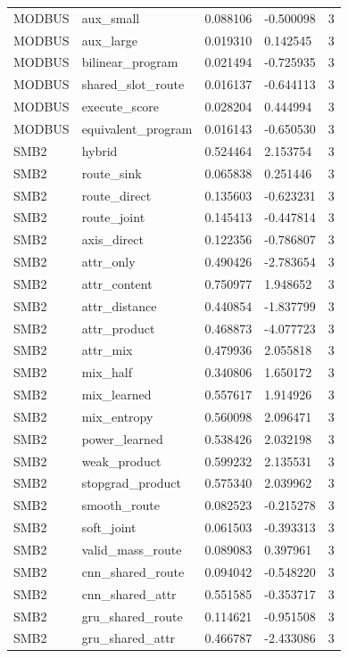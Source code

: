 \begin{tabular}{lllll}
MODBUS & aux\_small & 0.088106 & -0.500098 & 3 \\
MODBUS & aux\_large & 0.019310 & 0.142545 & 3 \\
MODBUS & bilinear\_program & 0.021494 & -0.725935 & 3 \\
MODBUS & shared\_slot\_route & 0.016137 & -0.644113 & 3 \\
MODBUS & execute\_score & 0.028204 & 0.444994 & 3 \\
MODBUS & equivalent\_program & 0.016143 & -0.650530 & 3 \\
SMB2 & hybrid & 0.524464 & 2.153754 & 3 \\
SMB2 & route\_sink & 0.065838 & 0.251446 & 3 \\
SMB2 & route\_direct & 0.135603 & -0.623231 & 3 \\
SMB2 & route\_joint & 0.145413 & -0.447814 & 3 \\
SMB2 & axis\_direct & 0.122356 & -0.786807 & 3 \\
SMB2 & attr\_only & 0.490426 & -2.783654 & 3 \\
SMB2 & attr\_content & 0.750977 & 1.948652 & 3 \\
SMB2 & attr\_distance & 0.440854 & -1.837799 & 3 \\
SMB2 & attr\_product & 0.468873 & -4.077723 & 3 \\
SMB2 & attr\_mix & 0.479936 & 2.055818 & 3 \\
SMB2 & mix\_half & 0.340806 & 1.650172 & 3 \\
SMB2 & mix\_learned & 0.557617 & 1.914926 & 3 \\
SMB2 & mix\_entropy & 0.560098 & 2.096471 & 3 \\
SMB2 & power\_learned & 0.538426 & 2.032198 & 3 \\
SMB2 & weak\_product & 0.599232 & 2.135531 & 3 \\
SMB2 & stopgrad\_product & 0.575340 & 2.039962 & 3 \\
SMB2 & smooth\_route & 0.082523 & -0.215278 & 3 \\
SMB2 & soft\_joint & 0.061503 & -0.393313 & 3 \\
SMB2 & valid\_mass\_route & 0.089083 & 0.397961 & 3 \\
SMB2 & cnn\_shared\_route & 0.094042 & -0.548220 & 3 \\
SMB2 & cnn\_shared\_attr & 0.551585 & -0.353717 & 3 \\
SMB2 & gru\_shared\_route & 0.114621 & -0.951508 & 3 \\
SMB2 & gru\_shared\_attr & 0.466787 & -2.433086 & 3 \\

\end{tabular}
